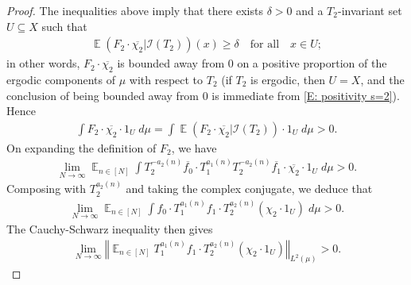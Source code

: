 \documentclass[11pt]{amsart}
\theoremstyle{definition}
\DeclareMathOperator*{\E}{\mathbb{E}}
\newcommand{\CI}{{\mathcal I}}
\newcommand{\norm}[1]{\left\Vert #1\right\Vert}
\newcommand{\1}{{\mathbf{1}}}
\begin{document}
\begin{proof}
    The inequalities above imply that there exists $\delta > 0$ and a $T_2$-invariant set $U\subseteq X$ such that
    \begin{align}\label{E: lower bound on U}
        \E(F_2\cdot \overline{\chi_2}|\CI(T_2))(x) \geq \delta \quad \textrm{for all}\quad x\in U;
    \end{align}
    in other words, $F_2\cdot \overline{\chi_2}$ is bounded away from 0 on a positive proportion of the ergodic components of $\mu$ with respect to $T_2$ (if $T_2$ is ergodic, then $U=X$, and the conclusion of being bounded away from 0 is immediate from \eqref{E: positivity s=2}).
    Hence
    \begin{align*}
        \int F_2 \cdot \overline{\chi_2}\cdot 1_U\; d\mu = \int \E(F_2\cdot \overline{\chi_2}|\CI(T_2))\cdot 1_U\; d\mu > 0.
    \end{align*}
    On expanding the definition of $F_2$, we have
    \begin{align}\label{E: expanding dual}
        \lim_{N\to\infty}\E_{n\in[N]}\int T_2^{-a_2(n)}\overline{f_0}\cdot T_1^{a_1(n)}T_2^{-a_2(n)}\overline{f_1}\cdot \overline{\chi_2}\cdot 1_U\; d\mu > 0.
    \end{align}
    Composing with $T_2^{a_2(n)}$ and taking the complex conjugate, we deduce that
    \begin{align}\label{E: chi_2}
        \lim_{N\to\infty}\E_{n\in[N]}\int {f_0}\cdot T_1^{a_1(n)}f_1\cdot T_2^{a_2(n)}(\chi_2\cdot 1_U)\; d\mu > 0.
    \end{align}
    The Cauchy-Schwarz inequality then gives
    \begin{align}\label{E: chi_2 2}
        \lim_{N\to\infty}\norm{\E_{n\in[N]} T_1^{a_1(n)}f_1\cdot T_2^{a_2(n)}(\chi_2\cdot 1_U)}_{L^2(\mu)}> 0.
    \end{align}
     

\end{proof}
\end{document}
